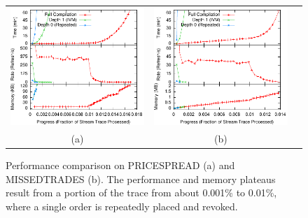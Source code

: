 \begin{figure}
\begin{center}
\begin{minipage}{\textwidth}
\begin{center}
\begin{tabular}{ccc}
\includegraphics[width=\figurewidth]{../graphs/graphs/unified_pricespread.pdf}&
\includegraphics[width=\figurewidth]{../graphs/graphs/unified_missedtrades.pdf}\\
(a) & (b)
\end{tabular}
\caption{Performance comparison on PRICESPREAD (a) and MISSEDTRADES (b). The performance and memory plateaus result from a portion of the trace from about 0.001\% to 0.01\%, where a single order is repeatedly placed and revoked.}
\label{fig:experiments:pricespread}
\label{fig:experiments:missedtrades}
\end{center}
\end{minipage}


\end{center}
\end{figure}
